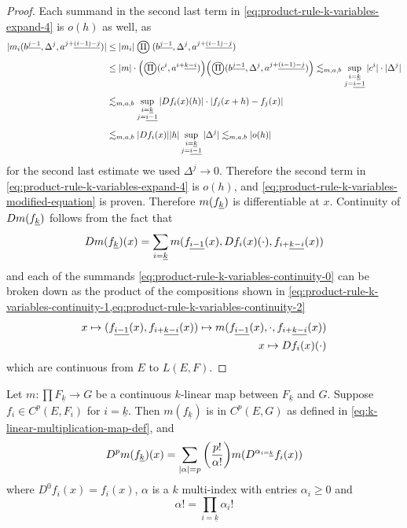 \documentclass[../main-v2-manifolds.tex]{subfiles}
\begin{document}
\begin{proof}
    Each summand in the second last term in \cref{eq:product-rule-k-variables-expand-4} is $o(h)$ as well, as
    \begin{align}
        \abs{m_i(\UPL{b}[j-1],\Delta^j,\UPL{a}[j+][(i-1)-j])}&\leq\vert m_i\vert\bigoprod(\UPL{b}[j-1],\Delta^j,\UPL{a}[j+][(i-1)-j])\\[1ex]
        &\leq \abs{m}\cdot\qty(\bigoprod(c^i,\UPL{a}[i+][k-i]))\qty(\bigoprod(\UPL{b}[j-1],\Delta^j,\UPL{a}[j+][(i-1)-j]))\Lsim_{m,a,b}\sup_{\substack{i=\underline{k}\\ j = \underline{i-1}}}\abs{c^i}\cdot\abs{\Delta^j}\nonumber\\[1ex]
        &\Lsim_{m,a,b}\sup_{\substack{i=\underline{k}\\ j = \underline{i-1}}}\abs{Df_i(x)(h)}\cdot\abs{f_j(x+h) - f_j(x)}\nonumber\\[1ex]
        &\Lsim_{m,a,b}\abs{Df_i(x)}\abs{h}\sup_{\substack{i=\underline{k}\\ j=\underline{i-1}}}\abs{\Delta^j}\Lsim_{m,a,b}\abs{o(h)}\label{eq:product-rule-k-variables-second-last-term-o(h)}
    \end{align}
    for the second last estimate we used $\Delta^j\to 0$. Therefore the second term in \cref{eq:product-rule-k-variables-expand-4} is $o(h)$, and \cref{eq:product-rule-k-variables-modified-equation} is proven. Therefore $m(\UL{f}[k])$ is differentiable at $x$. Continuity of $Dm(\UL{f}[k])$ follows from the fact that 
    \begin{equation}\label{eq:product-rule-k-variables-continuity-0}
        Dm(\UL{f}[k])(x) = \sum_{i=\underline{k}}m(\UL{f}[i-1](x),Df_i(x)(\cdot),\UL{f}[i+][k-i](x))
    \end{equation}
    and each of the summands \cref{eq:product-rule-k-variables-continuity-0} can be broken down as the product of the compositions shown in \cref{eq:product-rule-k-variables-continuity-1,eq:product-rule-k-variables-continuity-2}
    \begin{align}
        x\mapsto(\UL{f}[i-1](x),\UL{f}[i+][k-i](x))\mapsto m(\UL{f}[i-1](x),\cdot,\UL{f}[i+][k-i](x))\label{eq:product-rule-k-variables-continuity-1}\\
        x\mapsto Df_i(x)(\cdot)\label{eq:product-rule-k-variables-continuity-2}
    \end{align}
    which are continuous from $E$ to $L(E,F)$.
\end{proof}
\begin{corollary}
    Let $m: \prod F_{\underline{k}}\to G$ be a continuous $k$-linear map between $F_{\underline{k}}$ and $G$. Suppose $f_i\in C^p(E, F_i)$ for $i = \underline{k}$. Then $m(f_{\underline{k}})$ is in $C^p(E,G)$ as defined in \cref{eq:k-linear-multiplication-map-def}, and 
    \begin{equation}
        D^p m(f_{\underline{k}})(x) = \sum_{\vert {\alpha} \vert=p}\qty(\frac{p!}{\alpha !})m(D^{\alpha_{i=\underline{k}}}f_i(x))
        \label{eq:higher-order-k-linear-product-rule}
    \end{equation}
    where $D^0 f_i(x) = f_i(x)$, $\alpha$ is a $k$ multi-index with entries $\alpha_i\geq 0$ and 
    \[
        \alpha! = \prod_{i=\underline{k}}\alpha_i !
    \]
\end{corollary}
\end{document}
